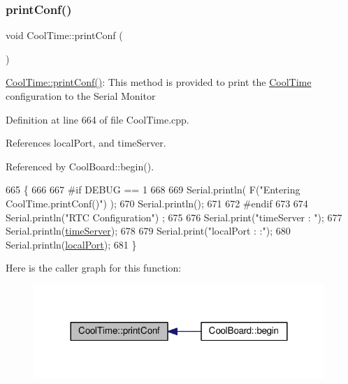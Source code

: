 \subsubsection{\texorpdfstring{print\+Conf()}{printConf()}}
{\footnotesize\ttfamily void Cool\+Time\+::print\+Conf (\begin{DoxyParamCaption}{ }\end{DoxyParamCaption})}

\hyperlink{classCoolTime_af355e7f9b3898211cd2ff25eab5933b1}{Cool\+Time\+::print\+Conf()}\+: This method is provided to print the \hyperlink{classCoolTime}{Cool\+Time} configuration to the Serial Monitor 

Definition at line 664 of file Cool\+Time.\+cpp.



References local\+Port, and time\+Server.



Referenced by Cool\+Board\+::begin().


\begin{DoxyCode}
665 \{
666 
667 \textcolor{preprocessor}{#if DEBUG == 1}
668 
669     Serial.println( F(\textcolor{stringliteral}{"Entering CoolTime.printConf()"}) );
670     Serial.println();
671 
672 \textcolor{preprocessor}{#endif }
673 
674     Serial.println(\textcolor{stringliteral}{"RTC Configuration"}) ;
675 
676     Serial.print(\textcolor{stringliteral}{"timeServer : "});
677     Serial.println(\hyperlink{classCoolTime_ad2b9858f399108cb440dd1e908916f04}{timeServer});
678     
679     Serial.print(\textcolor{stringliteral}{"localPort : :"});
680     Serial.println(\hyperlink{classCoolTime_a2f777da44d7ba678be8185299e9b49d1}{localPort});
681 \}
\end{DoxyCode}
Here is the caller graph for this function\+:\nopagebreak
\begin{figure}[H]
\begin{center}
\leavevmode
\includegraphics[width=312pt]{classCoolTime_af355e7f9b3898211cd2ff25eab5933b1_icgraph}
\end{center}
\end{figure}
\mbox{\label{classCoolTime_ae9658c9b377510d469e3b88edf33ee85}} 
